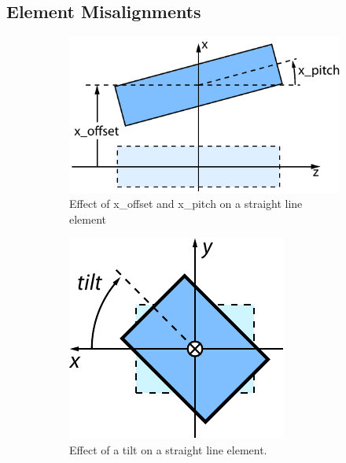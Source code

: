 \documentclass{hitec}
\begin{document}
\subsection{Element Misalignments}


\begin{figure}[tb]
  \centering
  \begin{subfigure}[b]{0.62\textwidth}
    \includegraphics[width=\textwidth]{pitch.pdf}
    \caption{Effect of x_offset and x_pitch on a straight line element}
    \label{f:pitch}
  \end{subfigure}
  \hfil
  \begin{subfigure}[b]{0.33\textwidth}
    \includegraphics[width=\textwidth]{tilt.pdf}
    \caption{Effect of a tilt on a straight line element.}
    \label{f:tilt}
  \end{subfigure}
  \caption{}
\end{figure}
\end{document}
